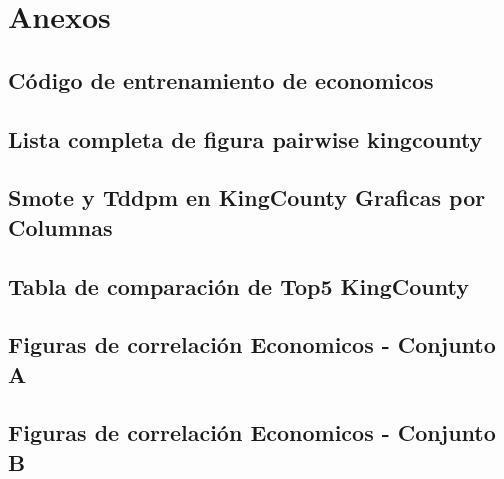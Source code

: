 \chapter{Anexos}

\section{Código de entrenamiento de economicos}



\section{Lista completa de figura pairwise kingcounty}
\label{A-pairwise-kingcounty-top2-a-1}


\section{Smote y Tddpm en KingCounty Graficas por Columnas}

%

\section{Tabla de comparación de Top5 KingCounty}

\section{Figuras de correlación Economicos - Conjunto A}
\label{pairwise-full-a}



\section{Figuras de correlación Economicos - Conjunto B}
\label{pairwise-full-a}


%

